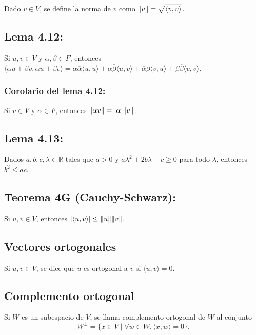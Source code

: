 \documentclass{article}
\begin{document}
Dado $v\in V$, se define la norma de $v$ como $\norm{v}=\sqrt{\langle v,v \rangle}$.

\subsection*{\color{blue} Lema 4.12:}

Si $u,v\in V$ y $\alpha,\beta\in F$, entonces $\langle \alpha u+\beta v,\alpha u+\beta v \rangle=\alpha\overline{\alpha}\langle u,u \rangle+\alpha\overline{\beta}\langle u,v \rangle+\overline{\alpha}\beta\langle v,u \rangle+\beta\overline{\beta}\langle v,v \rangle$.

\subsubsection*{\color{blue} Corolario del lema 4.12:}

Si $v\in V$ y $\alpha\in F$, entonces $\norm{\alpha v}=|\alpha|\norm{v}$.

\subsection*{\color{blue} Lema 4.13:}

Dados $a,b,c,\lambda\in\mathbb{R}$ tales que $a>0$ y $a\lambda^2+2b\lambda+c\geq 0$ para todo $\lambda$, entonces $b^2\leq ac$.

\subsection*{\color{red} Teorema 4G (Cauchy-Schwarz):}

Si $u,v\in V$, entonces $|\langle u,v\rangle|\leq\norm{u}\norm{v}$.

\subsection*{\color{violet} Vectores ortogonales}

Si $u,v\in V$, se dice que $u$ es ortogonal a $v$ si $\langle u,v\rangle=0$.

\subsection*{\color{violet} Complemento ortogonal}

Si $W$ es un subespacio de $V$, se llama complemento ortogonal de $W$ al conjunto 
$$W^{\perp}=\{x\in V\mid \forall w\in W,\langle x,w\rangle=0\}.$$
\end{document}
